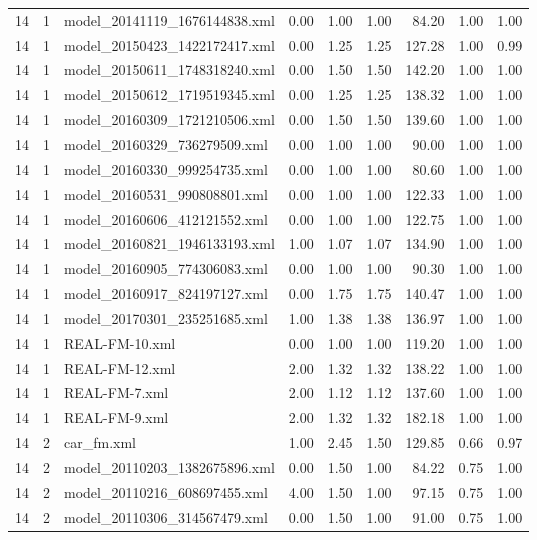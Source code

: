 \begin{table}[ht]
\begin{tabular}{rrlrrrrrr}
   14 &   1 & model\_20141119\_1676144838.xml & 0.00 & 1.00 & 1.00 & 84.20 & 1.00 & 1.00 \\ 
   14 &   1 & model\_20150423\_1422172417.xml & 0.00 & 1.25 & 1.25 & 127.28 & 1.00 & 0.99 \\ 
   14 &   1 & model\_20150611\_1748318240.xml & 0.00 & 1.50 & 1.50 & 142.20 & 1.00 & 1.00 \\ 
   14 &   1 & model\_20150612\_1719519345.xml & 0.00 & 1.25 & 1.25 & 138.32 & 1.00 & 1.00 \\ 
   14 &   1 & model\_20160309\_1721210506.xml & 0.00 & 1.50 & 1.50 & 139.60 & 1.00 & 1.00 \\ 
   14 &   1 & model\_20160329\_736279509.xml & 0.00 & 1.00 & 1.00 & 90.00 & 1.00 & 1.00 \\ 
   14 &   1 & model\_20160330\_999254735.xml & 0.00 & 1.00 & 1.00 & 80.60 & 1.00 & 1.00 \\ 
   14 &   1 & model\_20160531\_990808801.xml & 0.00 & 1.00 & 1.00 & 122.33 & 1.00 & 1.00 \\ 
   14 &   1 & model\_20160606\_412121552.xml & 0.00 & 1.00 & 1.00 & 122.75 & 1.00 & 1.00 \\ 
   14 &   1 & model\_20160821\_1946133193.xml & 1.00 & 1.07 & 1.07 & 134.90 & 1.00 & 1.00 \\ 
   14 &   1 & model\_20160905\_774306083.xml & 0.00 & 1.00 & 1.00 & 90.30 & 1.00 & 1.00 \\ 
   14 &   1 & model\_20160917\_824197127.xml & 0.00 & 1.75 & 1.75 & 140.47 & 1.00 & 1.00 \\ 
   14 &   1 & model\_20170301\_235251685.xml & 1.00 & 1.38 & 1.38 & 136.97 & 1.00 & 1.00 \\ 
   14 &   1 & REAL-FM-10.xml & 0.00 & 1.00 & 1.00 & 119.20 & 1.00 & 1.00 \\ 
   14 &   1 & REAL-FM-12.xml & 2.00 & 1.32 & 1.32 & 138.22 & 1.00 & 1.00 \\ 
   14 &   1 & REAL-FM-7.xml & 2.00 & 1.12 & 1.12 & 137.60 & 1.00 & 1.00 \\ 
   14 &   1 & REAL-FM-9.xml & 2.00 & 1.32 & 1.32 & 182.18 & 1.00 & 1.00 \\ 
   14 &   2 & car\_fm.xml & 1.00 & 2.45 & 1.50 & 129.85 & 0.66 & 0.97 \\ 
   14 &   2 & model\_20110203\_1382675896.xml & 0.00 & 1.50 & 1.00 & 84.22 & 0.75 & 1.00 \\ 
   14 &   2 & model\_20110216\_608697455.xml & 4.00 & 1.50 & 1.00 & 97.15 & 0.75 & 1.00 \\ 
   14 &   2 & model\_20110306\_314567479.xml & 0.00 & 1.50 & 1.00 & 91.00 & 0.75 & 1.00 \\ 

\end{tabular}
\end{table}
